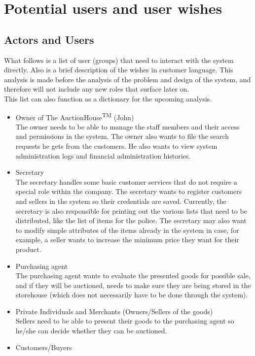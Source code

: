 \section{Potential users and user wishes}
\subsection{Actors and Users}
What follows is a list of user (groups) that need to interact with the system directly. Also is a brief description of the wishes in customer language. This analysis is made before the analysis of the problem and design of the system, and therefore will not include any new roles that surface later on.\\
This list can also function as a dictionary for the upcoming analysis.
\begin{itemize}[noitemsep]
	\item Owner of The AuctionHouse\textsuperscript{TM} (John)\\
		The owner needs to be able to manage the staff members and their access and permissions in the system. The owner also wants to file the search requests he gets from the customers. He also wants to view system administration logs and financial administration histories.
	\item Secretary\\
		The secretary handles some basic customer services that do not require a special role within the company. The secretary wants to register customers and sellers in the system so their credentials are saved. Currently, the secretary is also responsible for printing out the various lists that need to be distributed, like the list of items for the police. The secretary may also want to modify simple attributes of the items already in the system in case, for example, a seller wants to increase the minimum price they want for their product.
	\item Purchasing agent\\
		The purchasing agent wants to evaluate the presented goods for possible sale, and if they will be auctioned, needs to make sure they are being stored in the storehouse (which does not necessarily have to be done through the system).
	\item Private Individuals and Merchants (Owners/Sellers of the goods)\\
		Sellers need to be able to present their goods to the purchasing agent so he/she can decide whether they can be auctioned.
	\item Customers/Buyers\\

\end{itemize}
